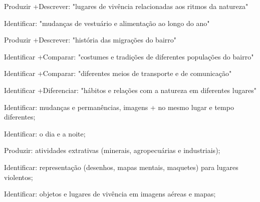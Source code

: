  Produzir +Descrever: "lugares de vivência relacionadas aos ritmos da natureza"

 Identificar: "mudanças de vestuário e alimentação ao longo do ano"

 Produzir +Descrever: "história das migrações do bairro"

 Identificar +Comparar: "costumes e tradições de diferentes populações do bairro"

 Identificar +Comparar: "diferentes meios de transporte e de comunicação"

 Identificar +Diferenciar: "hábitos e relações com a natureza em diferentes lugares"

 Identificar: mudanças e permanências, imagens + no mesmo lugar e tempo diferentes;

 Identificar: o dia e a noite;

 Produzir: atividades extrativas (minerais, agropecuárias e industriais);

 Identificar: representação (desenhos, mapas mentais, maquetes) para lugares violentos;

 Identificar: objetos e lugares de vivência em imagens aéreas e mapas;


